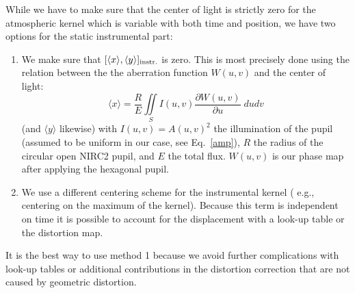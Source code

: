 \documentclass[a4paper]{article}
\begin{document}
While we have to make sure that the center of light is strictly zero for the atmospheric kernel which is variable with both time and position, we have two options for the static instrumental part:

\begin{enumerate}

\item
We make sure that $[\langle x \rangle , \langle y \rangle]_{\rm{instr.}}$ is zero. This is most precisely done using the relation between the the aberration function $W(u,v)$ and the center of light:
\begin{equation}
\langle x \rangle = \frac{R}{E} \iint \limits_S I(u,v) \frac{\partial W(u,v)}{\partial u} \; du dv
\end{equation}
(and $\langle y \rangle$ likewise) with $I(u,v) = A(u,v)^2$ the illumination of the pupil (assumed to be uniform in our case, see Eq.~\ref{amp}), $R$ the radius of the circular open NIRC2 pupil, and $E$ the total flux. $W(u,v)$ is our phase map after applying the hexagonal pupil.
\item
We use a different centering scheme for the instrumental kernel ( e.g., centering on the maximum of the kernel). Because this term is independent on time it is possible to account for the displacement with a look-up table or the distortion map. 
\end{enumerate}

It is the best way to use method 1 because we avoid further complications with look-up tables or additional contributions in the distortion correction that are not caused by geometric distortion.






\end{document}
